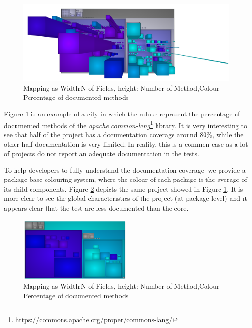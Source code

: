 \documentclass[]{usiinfbachelorproject}
\begin{document}
\begin{figure}[H]
	\centering
	\includegraphics[width=1\textwidth]{images/javaDoc}
	
	\caption[Java Documentation Mapping]{Mapping as Width:N of Fields, height: Number of Method,Colour: Percentage of documented methods\label{fig:javaDoc}}

\end{figure}

Figure \ref{fig:javaDoc} is an example of a city in which the colour represent the percentage of documented methods of the \textit{apache common-lang}\footnote{https://commons.apache.org/proper/commons-lang/} library. It is very interesting to see that half of the project has a documentation coverage around  80\%, while the other half documentation is very limited. In reality, this is a common case as a lot of projects do not report an adequate documentation in the tests.

To help developers to fully understand the documentation coverage, we provide a  package base colouring system, where the colour of each package is the average of its child components. 
Figure \ref{fig:OnlyPackage} depicts  the same project showed in Figure \ref{fig:javaDoc}. It is more clear to see the global characteristics of the project (at package level) and it appears clear that the test are less documented than the core.

\begin{figure}[H]
	\centering
	\includegraphics[width=0.5\textwidth]{images/javaDocOnlyPackage}
	
	\caption[Java Documentation Mapping Only Package]{Mapping as Width:N of Fields, height: Number of Method,Colour: Percentage of documented methods\label{fig:OnlyPackage}}
\end{figure}
\end{document}
